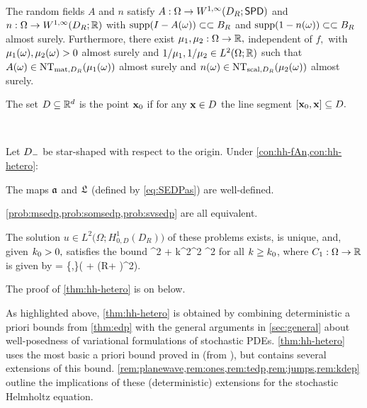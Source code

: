 
\label{con:hh-hetero}

\

\noindent The random fields $A$ and $n$ satisfy $A:\Omega\rightarrow\WoiDRspd$ and $n:\Omega\rightarrow \WoiDRRR$ with $\operatorname{supp}(I-A(\omega)) \subset\subset B_{R}$ and $\operatorname{supp}(1-n(\omega)) \subset\subset B_{R}$ almost surely.  Furthermore, there exist $\mu_{1}, \mu_{2}:\Omega\rightarrow \mathbb R,$ independent of $f,$ with $\mu_{1}(\omega),\mu_{2}(\omega) > 0$ almost surely and $1/\muo,1/\mut \in \LtORR$  such that $A(\omega) \in \NTA{\muo(\omega)}$ almost surely and $n(\omega) \in \NTn{\mut(\omega)}$ almost surely.
\econ


The set $D \subseteq \mathbb R^{d}$ is  the point $\mathbf{x}_{0}$ if for any $\mathbf{x} \in D$ the line segment $\mleft[\bxz,\bx\mright] \subseteq D.$
\ede

\label{thm:hh-hetero}

\

\noindent Let $D_{-}$ be star-shaped with respect to the origin. Under \cref{con:hh-fAn,con:hh-hetero}:
\bit
\item The maps $\mathfrak{a}$ and $\mathfrak{L}$ (defined by \eqref{eq:SEDPas}) are well-defined.
\item \cref{prob:msedp,prob:somsedp,prob:svsedp} are all equivalent.
\item The solution $u \in %
L^2\big(\Omega;H_{0,D}^1(D_R)\big)$
of these problems exists, is unique, and, given $k_{0} > 0,$ satisfies the bound
\beq\label{eq:Sbound1}
^2 + k^2^2\leq \NLoO{\Co} ^2
\eeq
for all $k\geq k_{0}$, where $C_{1}:\Omega\rightarrow\mathbb R$ is given by
\beq\label{eq:C1}
\Co = \max\mleft\{,\mright\}\mleft( + \mleft(R+ \mright)^2\mright).
\eeq
\eit
\enth

The proof of \cref{thm:hh-hetero} is on  below.

As highlighted above, \cref{thm:hh-hetero} is obtained by combining
deterministic a priori bounds from \cref{thm:edp} with the general
arguments in \cref{sec:general} about well-posedness of variational
formulations of stochastic PDEs. \cref{thm:hh-hetero} uses the most basic a priori bound proved
in \cite{GrPeSp:19} (from \cite[Theorem 2.5]{GrPeSp:19}), but \cite{GrPeSp:19}
contains several extensions of this bound. \cref{rem:planewave,rem:ones,rem:tedp,rem:jumps,rem:kdep}
outline the implications of these (deterministic) extensions for
the stochastic Helmholtz equation.

